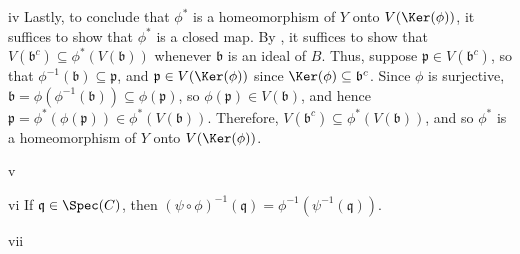 \begin{partsolution}{iv}
Lastly, to conclude that \(\phi^*\) is a homeomorphism of \(Y\) onto \(V(\Ker(\phi))\), it suffices to show that \(\phi^*\) is a closed map.
By , it suffices to show that \(V(\mathfrak{b}^c) \subseteq \phi^*(V(\mathfrak{b}))\) whenever \(\mathfrak{b}\) is an ideal of \(B\).
Thus, suppose \(\mathfrak{p} \in V(\mathfrak{b}^c)\), so that \(\phi^{-1}(\mathfrak{b}) \subseteq \mathfrak{p}\), and \(\mathfrak{p} \in V(\Ker(\phi))\) since \(\Ker(\phi) \subseteq \mathfrak{b}^c\).
Since \(\phi\) is surjective, \(\mathfrak{b} = \phi(\phi^{-1}(\mathfrak{b})) \subseteq \phi(\mathfrak{p})\), so \(\phi(\mathfrak{p}) \in V(\mathfrak{b})\), and hence \(\mathfrak{p} = \phi^*(\phi(\mathfrak{p})) \in \phi^*(V(\mathfrak{b}))\).
Therefore, \(V(\mathfrak{b}^c) \subseteq \phi^*(V(\mathfrak{b}))\), and so \(\phi^*\) is a homeomorphism of \(Y\) onto \(V(\Ker(\phi))\).
\end{partsolution}

\begin{partsolution}{v}

\end{partsolution}

\begin{partsolution}{vi}
If \(\mathfrak{q} \in \Spec(C)\), then \((\psi \circ \phi)^{-1}(\mathfrak{q}) = \phi^{-1}(\psi^{-1}(\mathfrak{q}))\).
\end{partsolution}

\begin{partsolution}{vii}

\end{partsolution}